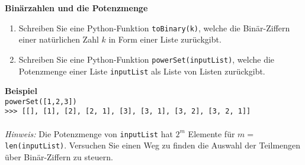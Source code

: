 \textbf{Binärzahlen und die Potenzmenge}
\begin{enumerate}
	\item Schreiben Sie eine Python-Funktion \texttt{toBinary(k)}, welche die Binär-Ziffern einer natürlichen Zahl $k$ in Form einer Liste zurückgibt.
	\item Schreiben Sie eine Python-Funktion \texttt{powerSet(inputList)}, welche die Potenzmenge einer Liste \verb|inputList| als Liste von Listen zurückgibt.
\end{enumerate}
\textbf{Beispiel}\\
\texttt{powerSet([1,2,3])}\\
\verb|>>> [[], [1], [2], [2, 1], [3], [3, 1], [3, 2], [3, 2, 1]]|\\
~\\
\textit{Hinweis:} Die Potenzmenge von \verb|inputList| hat $2^m$ Elemente für $m=$\verb|len(inputList)|. Versuchen Sie einen Weg zu finden die Auswahl der Teilmengen über Binär-Ziffern zu steuern.